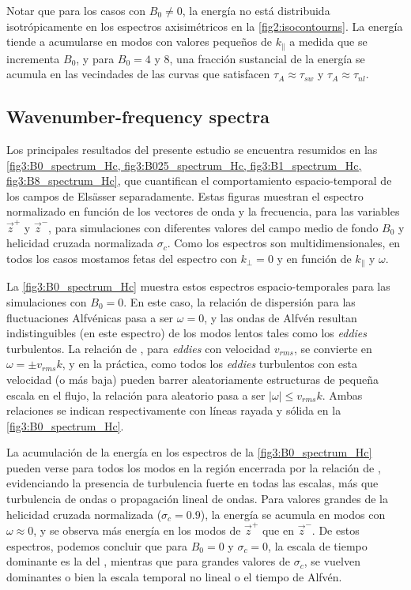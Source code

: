 Notar que para los casos con $B_0 \neq 0$, la energía no está
distribuida isotrópicamente en los espectros axisimétricos en la
\cref{fig2:isocontourns}. La energía tiende a acumularse en modos con
valores pequeños de $k_\parallel$ a medida que se incrementa $B_0$, y
para $B_0=4$ y $8$, una fracción sustancial de la energía se acumula
en las vecindades de las curvas que satisfacen
$\tau_A \approx \tau_{sw}$ y $\tau_A \approx \tau_{nl}$.


\subsection{Wavenumber-frequency spectra}\label{sec:wk}

Los principales resultados del presente estudio se encuentra resumidos
en las \cref{fig3:B0_spectrum_Hc, fig3:B025_spectrum_Hc,
  fig3:B1_spectrum_Hc, fig3:B8_spectrum_Hc}, que cuantifican el
comportamiento espacio-temporal de los campos de Els\"asser
separadamente. Estas figuras muestran el espectro normalizado en
función de los vectores de onda y la frecuencia, para las variables
$\vec{z}^+$ y $\vec{z}^-$, para simulaciones con diferentes valores
del campo medio de fondo $B_0$ y helicidad cruzada normalizada
$\sigma_c$. Como los espectros son multidimensionales, en todos los
casos mostamos fetas del espectro con $k_\perp=0$ y en función de
$k_\parallel$ y $\omega$.

La \cref{fig3:B0_spectrum_Hc} muestra estos espectros
espacio-temporales para las simulaciones con $B_0=0$. En este caso, la
relación de dispersión para las fluctuaciones Alfvénicas pasa a ser
$\omega=0$, y las ondas de Alfvén resultan indistinguibles (en este
espectro) de los modos lentos tales como los \textit{eddies}
turbulentos. La relación de \sweeping, para \textit{eddies} con
velocidad $v_{rms}$, se convierte en $\omega=\pm v_{rms} k$, y en la
práctica, como todos los \textit{eddies} turbulentos con esta
velocidad (o más baja) pueden barrer aleatoriamente estructuras de
pequeña escala en el flujo, la relación para \sweeping aleatorio pasa
a ser $|\omega| \leq v_{rms} k$. Ambas relaciones se indican
respectivamente con líneas rayada y sólida en la
\cref{fig3:B0_spectrum_Hc}.

La acumulación de la energía en los espectros de la
\cref{fig3:B0_spectrum_Hc} pueden verse para todos los modos en la
región encerrada por la relación de \sweeping, evidenciando la
presencia de turbulencia fuerte en todas las escalas, más que
turbulencia de ondas o propagación lineal de ondas. Para valores
grandes de la helicidad cruzada normalizada ($\sigma_c = 0.9$), la
energía se acumula en modos con $\omega\approx 0$, y se observa más
energía en los modos de $\vec{z}^+$ que en $\vec{z}^-$. De estos
espectros, podemos concluir que para $B_0=0$ y $\sigma_c=0$, la escala
de tiempo dominante es la del \sweeping, mientras que para grandes
valores de $\sigma_c$, se vuelven dominantes o bien la escala temporal
no lineal o el tiempo de Alfvén.

